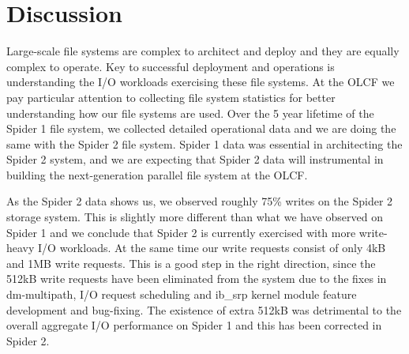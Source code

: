 \section{Discussion}
\label{sec:discuss} 

Large-scale file systems are complex to architect and deploy and they are
equally complex to operate. Key to successful deployment and operations is
understanding the I/O workloads exercising these file systems. At the OLCF we
pay particular attention to collecting file system statistics for better
understanding how our file systems are used. Over the 5 year lifetime of the
Spider 1 file system, we collected detailed operational data and we are doing
the same with the Spider 2 file system. Spider 1 data was essential in
architecting the Spider 2 system, and we are expecting that Spider 2 data will
instrumental in building the next-generation parallel file system at the OLCF.
 

As the Spider 2 data shows us, we observed roughly 75\% writes on the Spider 2
storage system. This is slightly more different than what we have observed on
Spider 1 and we conclude that Spider 2 is currently exercised with more
write-heavy I/O workloads. At the same time our write requests consist of only
4kB and 1MB write requests. This is a good step in the right direction, since
the 512kB write requests have been eliminated from the system due to the fixes 
in dm-multipath, I/O request scheduling and ib_srp kernel module feature 
development and bug-fixing. The existence of extra 512kB was detrimental to the
overall aggregate I/O performance on Spider 1 and this has been corrected in
Spider 2.  
